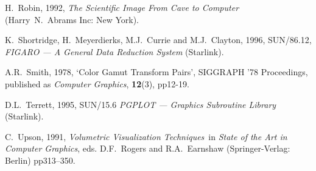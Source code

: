 \documentclass[twoside,11pt]{article}
\begin{document}
\begin{thebibliography}{99}
   H.~Robin, 1992, {\it The Scientific Image From Cave
   to Computer}\, (Harry~N.~Abrams Inc: New York).

   K.~Shortridge, H.~Meyerdierks, M.J.~Currie and
   M.J.~Clayton, 1996, SUN/86.12, {\it FIGARO --- A General Data
   Reduction System} (Starlink).

   A.R.~Smith, 1978, `Color Gamut Transform Pairs',
   SIGGRAPH '78 Proceedings, published as {\it Computer Graphics},
   {\bf 12}(3), pp12-19.

   D.L.~Terrett, 1995, SUN/15.6 {\it PGPLOT ---
   Graphics Subroutine Library}\, (Starlink).

   C.~Upson, 1991, {\it Volumetric Visualization
   Techniques}\, in {\it State of the Art in Computer Graphics},
   eds. D.F.~Rogers and R.A.~Earnshaw (Springer-Verlag: Berlin)
   pp313--350.

\end{thebibliography}

\typeout{  }
\typeout{*****************************************************}
\typeout{  }
\typeout{  }
\typeout{*****************************************************}
\typeout{  }
\end{document}
